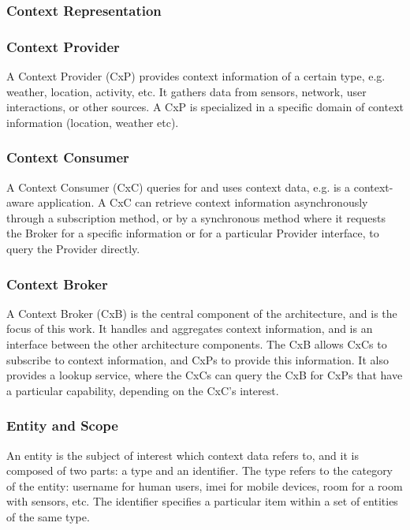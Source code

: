 \subsubsection{Context Representation}



\subsubsection{Context Provider}
A Context Provider (CxP) provides context information of a certain type, e.g. weather, location, activity, etc. It gathers data from sensors, network, user interactions, or other sources. A CxP is specialized in a specific domain of context information (location, weather etc).


\subsubsection{Context Consumer}
A Context Consumer (CxC) queries for and uses context data, e.g. is a context-aware application. A CxC can retrieve context information asynchronously through a subscription method, or by a synchronous method where it requests the Broker for a specific information or for a particular Provider interface, to query the Provider directly.

\subsubsection{Context Broker}
A Context Broker (CxB) is the central component of the architecture, and is the focus of this work. It handles and aggregates context information, and is an interface between the other architecture components. The CxB allows CxCs to subscribe to context information, and CxPs to provide this information. It also provides a lookup service, where the CxCs can query the CxB for CxPs that have a particular capability, depending on the CxC’s interest.

\subsubsection{Entity and Scope}
An entity is the subject of interest which context data refers to, and it is composed of two parts: a type and an identifier. The type refers to the category of the entity: username for human users, imei for mobile devices, room for a room with sensors, etc. The identifier specifies a particular item within a set of entities of the same type.

